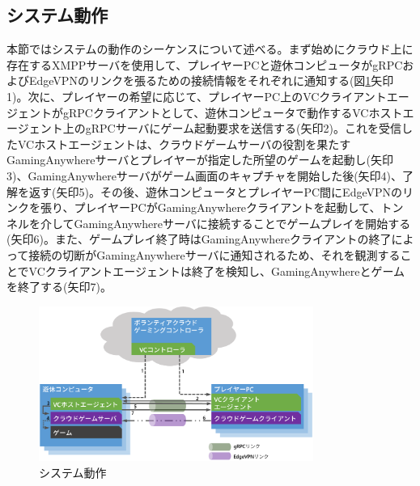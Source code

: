 \subsection{システム動作}
本節ではシステムの動作のシーケンスについて述べる。まず始めにクラウド上に存在するXMPPサーバを使用して、プレイヤーPCと遊休コンピュータがgRPCおよびEdgeVPNのリンクを張るための接続情報をそれぞれに通知する(図\ref{fig:seq}矢印1)。次に、プレイヤーの希望に応じて、プレイヤーPC上のVCクライアントエージェントがgRPCクライアントとして、遊休コンピュータで動作するVCホストエージェント上のgRPCサーバにゲーム起動要求を送信する(矢印2)。これを受信したVCホストエージェントは、クラウドゲームサーバの役割を果たすGamingAnywhereサーバとプレイヤーが指定した所望のゲームを起動し(矢印3)、GamingAnywhereサーバがゲーム画面のキャプチャを開始した後(矢印4)、了解を返す(矢印5)。その後、遊休コンピュータとプレイヤーPC間にEdgeVPNのリンクを張り、プレイヤーPCがGamingAnywhereクライアントを起動して、トンネルを介してGamingAnywhereサーバに接続することでゲームプレイを開始する(矢印6)。また、ゲームプレイ終了時はGamingAnywhereクライアントの終了によって接続の切断がGamingAnywhereサーバに通知されるため、それを観測することでVCクライアントエージェントは終了を検知し、GamingAnywhereとゲームを終了する(矢印7)。

\begin{figure}[t]
    \centering
    \includegraphics[width=0.8\textwidth,keepaspectratio,clip]{img/sequence.eps}
    \caption{システム動作}
    \label{fig:seq}
\end{figure}

